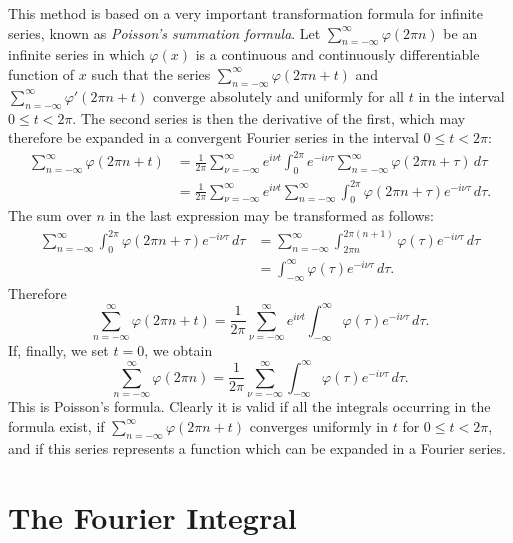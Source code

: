 This method is based on a very important transformation formula for infinite series, known as \emph{Poisson's summation formula}. Let
$\sum_{n=-\infty}^{\infty}\varphi(2\pi n)$ be an infinite series in which $\varphi(x)$ is a continuous and continuously differentiable function of $x$ such that the series $\sum_{n=-\infty}^{\infty}\varphi(2\pi n+t)$ and $\sum_{n=-\infty}^{\infty}\varphi'(2\pi n+t)$ converge absolutely and uniformly for all $t$ in the interval $0\le t<2\pi$. The second series is then the derivative of the first, which may therefore be expanded in a convergent Fourier series in the interval $0\le t<2\pi$:
\[
\begin{aligned}
\sum_{n=-\infty}^{\infty}\varphi(2\pi n+t)
&=\frac1{2\pi}\sum_{\nu=-\infty}^{\infty}e^{i\nu t}
 \int_0^{2\pi}e^{-i\nu\tau}
 \sum_{n=-\infty}^{\infty}\varphi(2\pi n+\tau)\,d\tau\\
&=\frac1{2\pi}\sum_{\nu=-\infty}^{\infty}e^{i\nu t}
 \sum_{n=-\infty}^{\infty}\int_0^{2\pi}
 \varphi(2\pi n+\tau)e^{-i\nu\tau}\,d\tau.
\end{aligned}
\]
The sum over $n$ in the last expression may be transformed as follows:
\[
\begin{aligned}
\sum_{n=-\infty}^{\infty}\int_0^{2\pi}
 \varphi(2\pi n+\tau)e^{-i\nu\tau}\,d\tau
&=\sum_{n=-\infty}^{\infty}\int_{2\pi n}^{2\pi(n+1)}
 \varphi(\tau)e^{-i\nu\tau}\,d\tau\\
&=\int_{-\infty}^{\infty}\varphi(\tau)e^{-i\nu\tau}\,d\tau.
\end{aligned}
\]
Therefore
\[
\sum_{n=-\infty}^{\infty}\varphi(2\pi n+t)
=\frac1{2\pi}\sum_{\nu=-\infty}^{\infty}e^{i\nu t}
 \int_{-\infty}^{\infty}\varphi(\tau)e^{-i\nu\tau}\,d\tau.
\]
If, finally, we set $t=0$, we obtain
\[
\sum_{n=-\infty}^{\infty}\varphi(2\pi n)
=\frac1{2\pi}\sum_{\nu=-\infty}^{\infty}
 \int_{-\infty}^{\infty}\varphi(\tau)e^{-i\nu\tau}\,d\tau.
\]
This is Poisson's formula. Clearly it is valid if all the integrals occurring in the formula exist, if $\sum_{n=-\infty}^{\infty}\varphi(2\pi n+t)$ converges uniformly in $t$ for $0\le t<2\pi$, and if this series represents a function which can be expanded in a Fourier series.

\section{The Fourier Integral}

